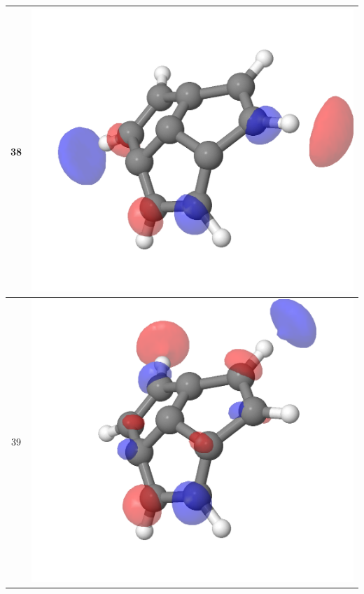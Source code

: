\documentclass{article}
\begin{document}
\begin{tabular}{|c|c|}
38 & \includegraphics[scale=0.3]{M1S_38.png}\\ \hline
39 & \includegraphics[scale=0.3]{M1S_39.png}\\ \hline

\end{tabular}
\end{document}
